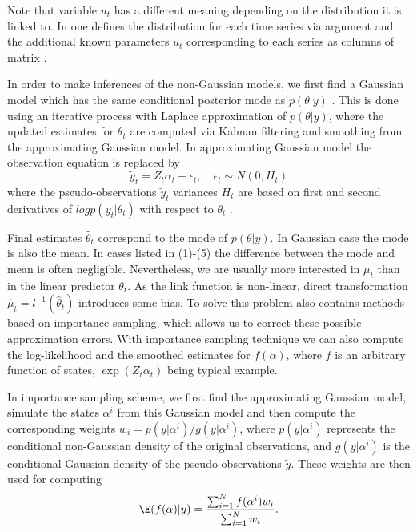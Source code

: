 \documentclass[nojss,article]{jss}\usepackage[]{graphicx}\usepackage[]{color}
\begin{document}
Note that variable $u_t$ has a different meaning depending on the distribution it is linked to. In  one defines the distribution for each time series via argument  and the additional known parameters $u_t$ corresponding to each series as columns of matrix .

In order to make inferences of the non-Gaussian models, we first find a Gaussian model which has the same conditional posterior mode as $p(\theta|y)$ \citep{DK2000}. This is done using an iterative process with Laplace approximation of $p(\theta|y)$, where the updated estimates for $\theta_t$ are computed via Kalman filtering and smoothing from the approximating Gaussian model. In approximating Gaussian model the observation equation is replaced by 
\begin{equation*}
\tilde y_t = Z_t\alpha_t + \epsilon_t, \quad \epsilon_t \sim N(0,H_t)
\end{equation*}
where the pseudo-observations $\tilde y_t$ variances $H_t$ are based on first and second derivatives of $log p(y_t|\theta_t)$ with respect to $\theta_t$ \citep{DK2000}. 

Final estimates $\hat \theta_t$ correspond to the mode of $p(\theta|y)$. In Gaussian case the mode is also the mean. In cases listed in (1)-(5) the difference between the mode and mean is often negligible. Nevertheless, we are usually more interested in $\mu_t$ than in the linear predictor $\theta_t$. As the link function is non-linear, direct transformation $\hat \mu_t=l^{-1}(\hat \theta_t)$ introduces some bias. To solve this problem  also contains methods based on importance sampling, which allows us to correct these possible approximation errors. With importance sampling technique we can also compute the log-likelihood and the smoothed estimates for $f(\alpha)$, where $f$ is an arbitrary function of states, $\exp(Z_t\alpha_t)$ being typical example.

In importance sampling scheme, we first find the approximating Gaussian model, simulate the states $\alpha^i$ from this Gaussian model and then compute the corresponding weights $w_i=p(y|\alpha^i)/g(y|\alpha^i)$, where $p(y|\alpha^i)$ represents the conditional non-Gaussian density of the original observations, and $g(y|\alpha^i)$ is the conditional Gaussian density of the pseudo-observations $\tilde y$. These weights are then used for computing
\begin{equation*}
\E(f(\alpha)|y) = \frac{\sum_{i=1}^N f(\alpha^i) w_i}{\sum_{i=1}^Nw_i}.
\end{equation*}
\end{document}
